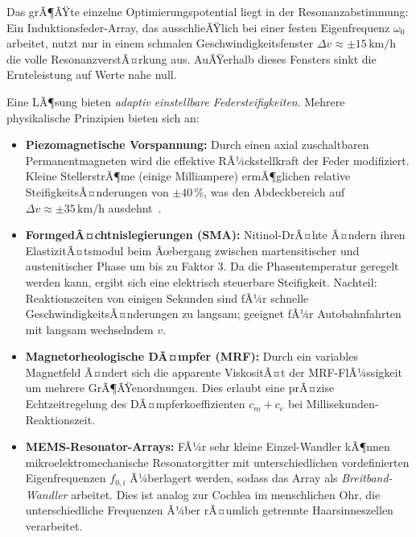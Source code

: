 ﻿\documentclass[12pt, a4paper]{report}
\theoremstyle{definition}
\theoremstyle{remark}
\begin{document}
Das grÃ¶ÃŸte einzelne Optimierungspotential liegt in der Resonanzabstimmung:
Ein Induk\-tionsfeder-Array, das ausschlieÃŸlich bei einer festen Eigenfrequenz
$\omega_0$ arbeitet, nutzt nur in einem schmalen Geschwindigkeitsfenster
$\Delta v \approx \pm 15\,\text{km/h}$ die volle ResonanzverstÃ¤rkung aus.
AuÃŸerhal\-b dieses Fensters sinkt die Ernteleistung auf Werte nahe null.

Eine LÃ¶sung bieten \emph{adaptiv einstellbare Federsteifigkeiten}. Mehrere
physikalische Prinzipien bieten sich an:

\begin{itemize}
  \item \textbf{Piezomagnetische Vorspannung:} Durch einen axial zuschaltbaren
        Permanentmagneten wird die effektive RÃ¼ckstellkraft der Feder modifiziert.
        Kleine StellerstrÃ¶me (einige Milliampere) ermÃ¶glichen relative
        SteifigkeitsÃ¤nderungen von $\pm 40\,\%$, was den Abdeckbereich auf
        $\Delta v \approx \pm 35\,\text{km/h}$ ausdehnt~\cite{tang2009}.

  \item \textbf{FormgedÃ¤chtnislegierungen (SMA):} Nitinol-DrÃ¤hte Ã¤ndern ihren
        ElastizitÃ¤tsmodul beim Ãœbergang zwischen martensitischer und
        austenitischer Phase um bis zu Faktor 3. Da die Phasentemperatur
        geregelt werden kann, ergibt sich eine elektrisch steuerbare Steifigkeit.
        Nachteil: Reaktionszeiten von einigen Sekunden sind fÃ¼r schnelle
        GeschwindigkeitsÃ¤nderungen zu langsam; geeignet fÃ¼r Autobahnfahrten
        mit langsam wechselndem $v$.

  \item \textbf{Magnetorheologische DÃ¤mpfer (MRF):} Durch ein variables
        Magnetfeld Ã¤ndert sich die apparente ViskositÃ¤t der MRF-FlÃ¼ssigkeit
        um mehrere GrÃ¶ÃŸenordnungen. Dies erlaubt eine prÃ¤zise Echtzeitregelung
        des DÃ¤mpferkoeffizienten $c_m + c_e$ bei Millisekunden-Reaktionszeit.

  \item \textbf{MEMS-Resonator-Arrays:} FÃ¼r sehr kleine Einzel-Wandler kÃ¶nnen
        mikro\-elektro\-mechanische Resonatorgitter mit unterschiedlichen
        vordefinierten Eigenfrequenzen $f_{0,i}$ Ã¼berlagert werden, sodass das
        Array als \emph{Breitband-Wandler} arbeitet. Dies ist analog zur
        Cochlea im menschlichen Ohr, die unterschiedliche Frequenzen Ã¼ber
        rÃ¤umlich getrennte Haarsinneszellen verarbeitet.
\end{itemize}
\end{document}
